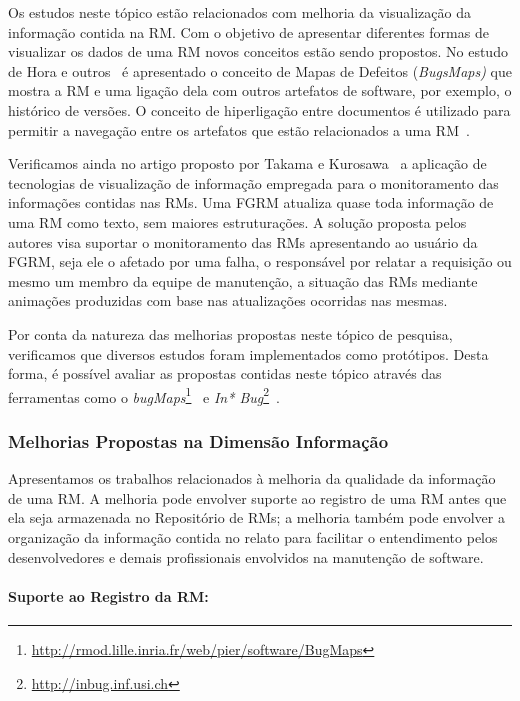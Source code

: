 Os estudos neste tópico estão relacionados com melhoria da visualização da
informação contida na RM\@. Com o objetivo de apresentar diferentes formas de
visualizar os dados de uma RM novos conceitos estão sendo propostos. No estudo
de Hora e outros~\cite{hora2012bug} é apresentado o conceito de Mapas de
Defeitos (\textit{BugsMaps)} que mostra a RM e uma ligação dela com outros
artefatos de software, por exemplo, o histórico de versões. O conceito de
hiperligação entre documentos é utilizado para permitir a navegação entre os
artefatos que estão relacionados a uma RM~\cite{dal2014bug}.

Verificamos ainda no artigo proposto por Takama e
Kurosawa~\cite{takama2013application} a aplicação de tecnologias de
visualização de informação empregada para o monitoramento das informações
contidas nas RMs. Uma FGRM atualiza quase toda informação de uma RM como texto,
sem maiores estruturações. A solução proposta pelos autores visa suportar o
monitoramento das RMs apresentando ao usuário da FGRM, seja ele o afetado por
uma falha, o responsável por relatar a requisição ou mesmo um membro da equipe
de manutenção, a situação das RMs mediante animações produzidas com base nas
atualizações ocorridas nas mesmas.

Por conta da natureza das melhorias propostas neste tópico de pesquisa,
verificamos que diversos estudos foram implementados como protótipos. Desta
forma, é possível avaliar as propostas contidas neste tópico através das
ferramentas como o
\textit{bugMaps}\footnote{\url{http://rmod.lille.inria.fr/web/pier/software/BugMaps}}~\cite{hora2012bug}
e \textit{In* Bug}\footnote{\url{http://inbug.inf.usi.ch}}~\cite{dal2014bug}.

\subsubsection{Melhorias Propostas na Dimensão Informação}
\label{ssub:melhorias_dim_informacao}

Apresentamos os trabalhos relacionados à melhoria da qualidade da informação de
uma RM\@. A melhoria pode envolver suporte ao registro de uma RM antes que ela
seja armazenada no Repositório de RMs; a melhoria também pode envolver a
organização da informação contida no relato para facilitar o entendimento pelos
desenvolvedores e demais profissionais envolvidos na manutenção de software.

\paragraph{Suporte ao Registro da RM:}

